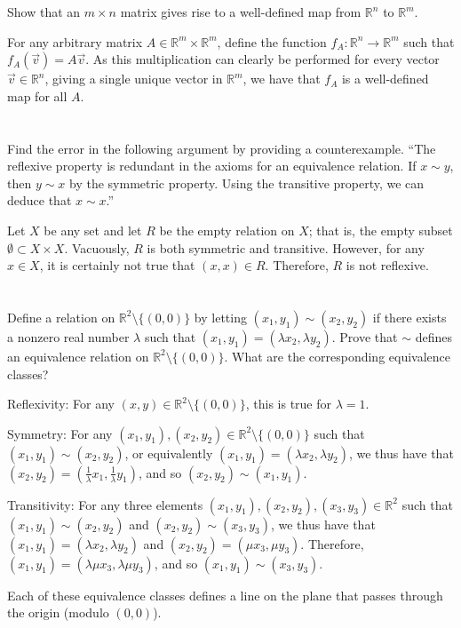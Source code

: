 Show that an $m \times n$ matrix gives rise to a well-defined map from $\mathbb{R}^n$ to $\mathbb{R}^m$.
\hr

For any arbitrary matrix $A \in \mathbb{R}^m \times \mathbb{R}^m$, define the function $f_A: \mathbb{R}^n \rightarrow \mathbb{R}^m$ such that $f_A(\vec{v}) = A\vec{v}$. As this multiplication can clearly be performed for every vector $\vec{v} \in \mathbb{R}^n$, giving a single unique vector in $\mathbb{R}^m$, we have that $f_A$ is a well-defined map for all $A$.
\pagebreak
\section{}\label{sec:1-28}

Find the error in the following argument by providing a counterexample. ``The reflexive property is redundant in the axioms for an equivalence relation. If $x \sim y$, then $y \sim x$ by the symmetric property. Using the transitive property, we can deduce that $x \sim x$.''
\hr

Let $X$ be any set and let $R$ be the empty relation on $X$; that is, the empty subset $\emptyset \subset X \times X$. Vacuously, $R$ is both symmetric and transitive. However, for any $x \in X$, it is certainly not true that $(x, x) \in R$. Therefore, $R$ is not reflexive.

\section{}\label{sec:1-29}

Define a relation on $\mathbb{R}^2 \setminus \{(0, 0)\}$ by letting $(x_1, y_1) \sim (x_2, y_2)$ if there exists a nonzero real number $\lambda$ such that $(x_1, y_1) = (\lambda x_2, \lambda y_2)$. Prove that $\sim$ defines an equivalence relation on $\mathbb{R}^2 \setminus \{(0, 0)\}$. What are the corresponding equivalence classes?
\hr

Reflexivity: For any $(x, y) \in \mathbb{R}^2 \setminus \{(0, 0)\}$, this is true for $\lambda = 1$.

\smallskip

Symmetry: For any $(x_1, y_1), (x_2, y_2) \in \mathbb{R}^2 \setminus \{(0, 0)\}$ such that $(x_1, y_1) \sim (x_2, y_2)$, or equivalently $(x_1, y_1) = (\lambda x_2, \lambda y_2)$, we thus have that $(x_2, y_2) = \left(\frac{1}{\lambda}x_1, \frac{1}{\lambda}y_1\right)$, and so $(x_2, y_2) \sim (x_1, y_1)$.

\smallskip

Transitivity: For any three elements $(x_1, y_1), (x_2, y_2), (x_3, y_3) \in \mathbb{R}^2$ such that\\$(x_1, y_1) \sim (x_2, y_2)$ and $(x_2, y_2) \sim (x_3, y_3)$, we thus have that $(x_1, y_1) = (\lambda x_2, \lambda y_2)$ and $(x_2, y_2) = (\mu x_3, \mu y_3)$. Therefore, $(x_1, y_1) = (\lambda\mu x_3, \lambda\mu y_3)$, and so $(x_1, y_1) \sim (x_3, y_3)$.

\smallskip

Each of these equivalence classes defines a line on the plane that passes through the origin (modulo $(0,0)$).